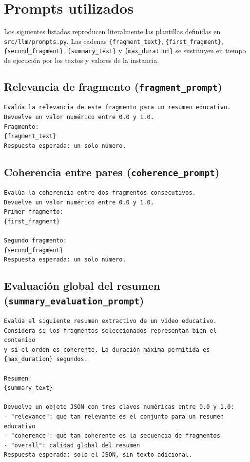 \documentclass[12pt,a4paper]{article}
\begin{document}
\section{Prompts utilizados}

Los siguientes listados reproducen literalmente las plantillas definidas en \texttt{src/llm/prompts.py}. Las cadenas \texttt{\{fragment\_text\}}, \texttt{\{first\_fragment\}}, \texttt{\{second\_fragment\}}, \texttt{\{summary\_text\}} y \texttt{\{max\_duration\}} se sustituyen en tiempo de ejecución por los textos y valores de la instancia.

\subsection{Relevancia de fragmento (\texttt{fragment\_prompt})}

\begin{small}
\begin{verbatim}
Evalúa la relevancia de este fragmento para un resumen educativo.
Devuelve un valor numérico entre 0.0 y 1.0.
Fragmento:
{fragment_text}
Respuesta esperada: un solo número.
\end{verbatim}
\end{small}

\subsection{Coherencia entre pares (\texttt{coherence\_prompt})}

\begin{small}
\begin{verbatim}
Evalúa la coherencia entre dos fragmentos consecutivos.
Devuelve un valor numérico entre 0.0 y 1.0.
Primer fragmento:
{first_fragment}

Segundo fragmento:
{second_fragment}
Respuesta esperada: un solo número.
\end{verbatim}
\end{small}

\subsection{Evaluación global del resumen (\texttt{summary\_evaluation\_prompt})}

\begin{small}
\begin{verbatim}
Evalúa el siguiente resumen extractivo de un video educativo.
Considera si los fragmentos seleccionados representan bien el contenido
y si el orden es coherente. La duración máxima permitida es {max_duration} segundos.

Resumen:
{summary_text}

Devuelve un objeto JSON con tres claves numéricas entre 0.0 y 1.0:
- "relevance": qué tan relevante es el conjunto para un resumen educativo
- "coherence": qué tan coherente es la secuencia de fragmentos
- "overall": calidad global del resumen
Respuesta esperada: solo el JSON, sin texto adicional.
\end{verbatim}
\end{small}





\end{document}
